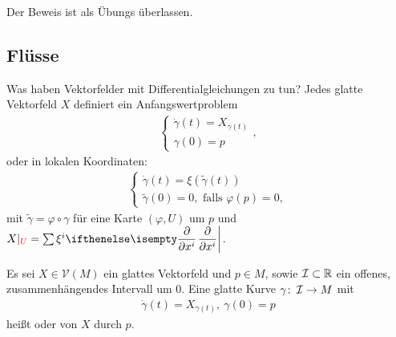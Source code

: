 Der Beweis ist als Übungs überlassen.


\subsection{Flüsse}

Was haben Vektorfelder mit Differentialgleichungen zu tun? Jedes glatte Vektorfeld $X$ definiert ein Anfangswertproblem
\begin{align*}
  \begin{cases}
    \dot \gamma(t) = X_{\gamma(t)}\\
    \gamma(0) = p
  \end{cases},
\end{align*}
oder in lokalen Koordinaten:
\begin{align*}
  \begin{cases}
    \dot \gamma(t) = \xi(\tilde \gamma(t))\\
    \tilde \gamma(0) = 0, \text{ falls } \varphi(p) = 0,
  \end{cases}
\end{align*}
mit $\tilde \gamma = \varphi \circ \gamma$ für eine Karte $(\varphi,U)$ um $p$ und $X|_{\textcolor{red}{U}} = \sum \xi^i \pdifffrac{}{x^i}$.

\begin{dfn}
  Es sei $X \in \mathcal V(M)$ ein glattes Vektorfeld und $p \in M$, sowie $\operatorname{\mathcal{I}} \subset \operatorname{\mathbb{R}}$ ein offenes, zusammenhängendes Intervall um $0$. Eine glatte Kurve $\gamma \colon \operatorname{\mathcal{I}} \to M$ mit
  \begin{align*}
    \dot \gamma(t) = X_{\gamma(t)}, \ \gamma(0) = p
  \end{align*}
  heißt  oder  von $X$ durch $p$.
\end{dfn}

